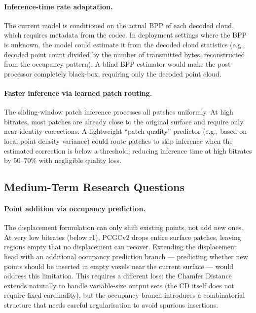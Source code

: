 \paragraph{Inference-time rate adaptation.}
The current model is conditioned on the actual BPP of each decoded cloud,
which requires metadata from the codec.
In deployment settings where the BPP is unknown, the model could estimate it
from the decoded cloud statistics (e.g., decoded point count divided by the
number of transmitted bytes, reconstructed from the occupancy pattern).
A blind BPP estimator would make the post-processor completely black-box,
requiring only the decoded point cloud.

\paragraph{Faster inference via learned patch routing.}
The sliding-window patch inference processes all patches uniformly.
At high bitrates, most patches are already close to the original surface and
require only near-identity corrections.
A lightweight ``patch quality'' predictor (e.g., based on local point density
variance) could route patches to skip inference when the estimated correction
is below a threshold, reducing inference time at high bitrates by
$50$--$70\%$ with negligible quality loss.

\subsection*{Medium-Term Research Questions}

\paragraph{Point addition via occupancy prediction.}
The displacement formulation can only shift existing points, not add new ones.
At very low bitrates (below r1), PCGCv2 drops entire surface patches, leaving
regions empty that no displacement can recover.
Extending the displacement head with an additional occupancy prediction branch
--- predicting whether new points should be inserted in empty voxels near the
current surface --- would address this limitation.
This requires a different loss: the Chamfer Distance extends naturally to
handle variable-size output sets (the CD itself does not require
fixed cardinality), but the occupancy branch introduces a combinatorial
structure that needs careful regularisation to avoid spurious insertions.

